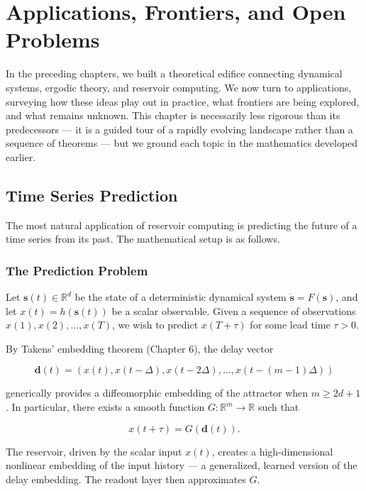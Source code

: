 \chapter{Applications, Frontiers, and Open Problems}\label{ch:17}

In the preceding chapters, we built a theoretical edifice connecting dynamical systems, ergodic theory, and reservoir computing. We now turn to applications, surveying how these ideas play out in practice, what frontiers are being explored, and what remains unknown. This chapter is necessarily less rigorous than its predecessors --- it is a guided tour of a rapidly evolving landscape rather than a sequence of theorems --- but we ground each topic in the mathematics developed earlier.


\bigskip


\section{Time Series Prediction}\label{sec:17.1}

The most natural application of reservoir computing is predicting the future of a time series from its past. The mathematical setup is as follows.

\subsection{The Prediction Problem}\label{sec:17.1.1}

Let $\mathbf{s}(t) \in \mathbb{R}^d$ be the state of a deterministic dynamical system $\dot{\mathbf{s}} = F(\mathbf{s})$, and let $x(t) = h(\mathbf{s}(t))$ be a scalar observable. Given a sequence of observations $x(1), x(2), \ldots, x(T)$, we wish to predict $x(T + \tau)$ for some lead time $\tau > 0$.

By Takens' embedding theorem (Chapter 6), the delay vector

\[
\mathbf{d}(t) = (x(t), x(t - \Delta), x(t - 2\Delta), \ldots, x(t - (m-1)\Delta))
\]

generically provides a diffeomorphic embedding of the attractor when $m \geq 2d + 1$. In particular, there exists a smooth function $G: \mathbb{R}^m \to \mathbb{R}$ such that

\[
x(t + \tau) = G(\mathbf{d}(t)).
\]

The reservoir, driven by the scalar input $x(t)$, creates a high-dimensional nonlinear embedding of the input history --- a generalized, learned version of the delay embedding. The readout layer then approximates $G$.

